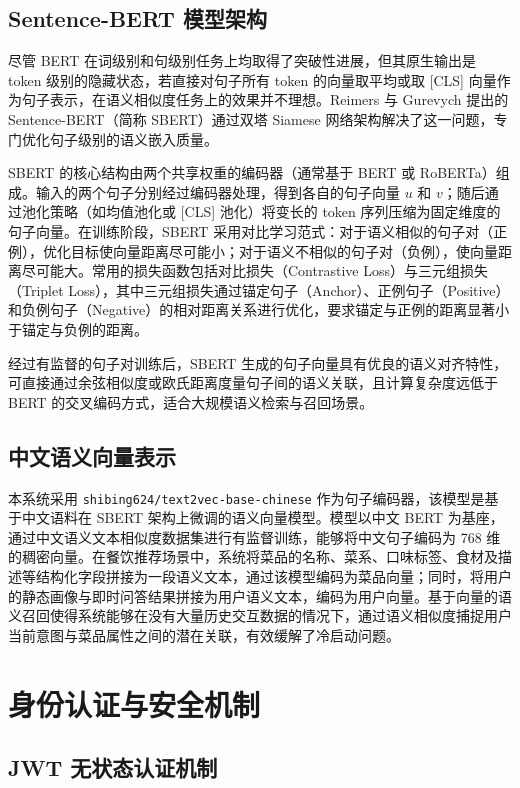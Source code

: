 \subsection{Sentence-BERT 模型架构}

尽管 BERT 在词级别和句级别任务上均取得了突破性进展，但其原生输出是 token 级别的隐藏状态，若直接对句子所有 token 的向量取平均或取 [CLS] 向量作为句子表示，在语义相似度任务上的效果并不理想。Reimers 与 Gurevych 提出的 Sentence-BERT（简称 SBERT）通过双塔 Siamese 网络架构解决了这一问题\super{[22]}，专门优化句子级别的语义嵌入质量。

SBERT 的核心结构由两个共享权重的编码器（通常基于 BERT 或 RoBERTa）组成。输入的两个句子分别经过编码器处理，得到各自的句子向量 $u$ 和 $v$；随后通过池化策略（如均值池化或 [CLS] 池化）将变长的 token 序列压缩为固定维度的句子向量。在训练阶段，SBERT 采用对比学习范式：对于语义相似的句子对（正例），优化目标使向量距离尽可能小；对于语义不相似的句子对（负例），使向量距离尽可能大。常用的损失函数包括对比损失（Contrastive Loss）与三元组损失（Triplet Loss），其中三元组损失通过锚定句子（Anchor）、正例句子（Positive）和负例句子（Negative）的相对距离关系进行优化，要求锚定与正例的距离显著小于锚定与负例的距离。

经过有监督的句子对训练后，SBERT 生成的句子向量具有优良的语义对齐特性，可直接通过余弦相似度或欧氏距离度量句子间的语义关联，且计算复杂度远低于 BERT 的交叉编码方式，适合大规模语义检索与召回场景。

\subsection{中文语义向量表示}

本系统采用 \texttt{shibing624/text2vec-base-chinese} 作为句子编码器，该模型是基于中文语料在 SBERT 架构上微调的语义向量模型。模型以中文 BERT 为基座，通过中文语义文本相似度数据集进行有监督训练，能够将中文句子编码为 768 维的稠密向量。在餐饮推荐场景中，系统将菜品的名称、菜系、口味标签、食材及描述等结构化字段拼接为一段语义文本，通过该模型编码为菜品向量；同时，将用户的静态画像与即时问答结果拼接为用户语义文本，编码为用户向量。基于向量的语义召回使得系统能够在没有大量历史交互数据的情况下，通过语义相似度捕捉用户当前意图与菜品属性之间的潜在关联，有效缓解了冷启动问题。

\section{身份认证与安全机制}

\subsection{JWT 无状态认证机制}

